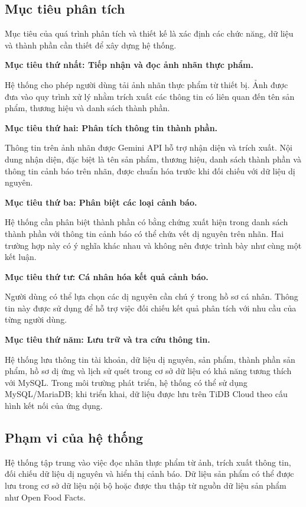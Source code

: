 \subsection{Mục tiêu phân tích}

Mục tiêu của quá trình phân tích và thiết kế là xác định các chức năng, dữ liệu và thành phần cần thiết để xây dựng hệ thống.

\textbf{Mục tiêu thứ nhất: Tiếp nhận và đọc ảnh nhãn thực phẩm.}

Hệ thống cho phép người dùng tải ảnh nhãn thực phẩm từ thiết bị. Ảnh được đưa vào quy trình xử lý nhằm trích xuất các thông tin có liên quan đến tên sản phẩm, thương hiệu và danh sách thành phần.

\textbf{Mục tiêu thứ hai: Phân tích thông tin thành phần.}

Thông tin trên ảnh nhãn được Gemini API hỗ trợ nhận diện và trích xuất. Nội dung nhận diện, đặc biệt là tên sản phẩm, thương hiệu, danh sách thành phần và thông tin cảnh báo trên nhãn, được chuẩn hóa trước khi đối chiếu với dữ liệu dị nguyên.

\textbf{Mục tiêu thứ ba: Phân biệt các loại cảnh báo.}

Hệ thống cần phân biệt thành phần có bằng chứng xuất hiện trong danh sách thành phần với thông tin cảnh báo có thể chứa vết dị nguyên trên nhãn. Hai trường hợp này có ý nghĩa khác nhau và không nên được trình bày như cùng một kết luận.

\textbf{Mục tiêu thứ tư: Cá nhân hóa kết quả cảnh báo.}

Người dùng có thể lựa chọn các dị nguyên cần chú ý trong hồ sơ cá nhân. Thông tin này được sử dụng để hỗ trợ việc đối chiếu kết quả phân tích với nhu cầu của từng người dùng.

\textbf{Mục tiêu thứ năm: Lưu trữ và tra cứu thông tin.}

Hệ thống lưu thông tin tài khoản, dữ liệu dị nguyên, sản phẩm, thành phần sản phẩm, hồ sơ dị ứng và lịch sử quét trong cơ sở dữ liệu có khả năng tương thích với MySQL. Trong môi trường phát triển, hệ thống có thể sử dụng MySQL/MariaDB; khi triển khai, dữ liệu được lưu trên TiDB Cloud theo cấu hình kết nối của ứng dụng.

\subsection{Phạm vi của hệ thống}

Hệ thống tập trung vào việc đọc nhãn thực phẩm từ ảnh, trích xuất thông tin, đối chiếu dữ liệu dị nguyên và hiển thị cảnh báo. Dữ liệu sản phẩm có thể được lưu trong cơ sở dữ liệu nội bộ hoặc được thu thập từ nguồn dữ liệu sản phẩm như Open Food Facts.

